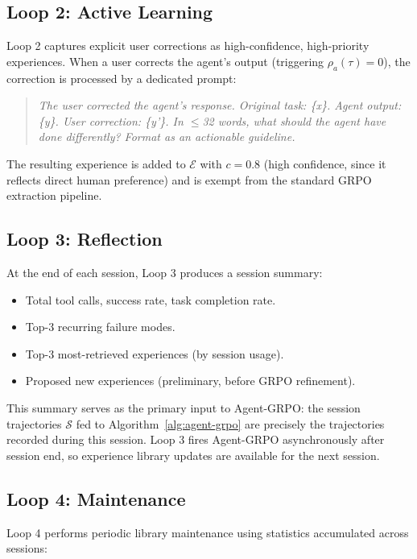 \subsection{Loop 2: Active Learning}

Loop 2 captures explicit user corrections as high-confidence, high-priority
experiences. When a user corrects the agent's output (triggering
$\rho_a(\tau) = 0$), the correction is processed by a dedicated prompt:

\begin{quote}
\textit{The user corrected the agent's response. Original task: \{x\}. Agent
output: \{y\}. User correction: \{y'\}. In $\leq$32 words, what should the
agent have done differently? Format as an actionable guideline.}
\end{quote}

The resulting experience is added to $\mathcal{E}$ with $c = 0.8$ (high
confidence, since it reflects direct human preference) and is exempt from the
standard GRPO extraction pipeline.

\subsection{Loop 3: Reflection}

At the end of each session, Loop 3 produces a session summary:
\begin{itemize}[leftmargin=1.5em]
    \item Total tool calls, success rate, task completion rate.
    \item Top-3 recurring failure modes.
    \item Top-3 most-retrieved experiences (by session usage).
    \item Proposed new experiences (preliminary, before GRPO refinement).
\end{itemize}

This summary serves as the primary input to Agent-GRPO: the session
trajectories $\mathcal{S}$ fed to Algorithm~\ref{alg:agent-grpo} are
precisely the trajectories recorded during this session. Loop 3 fires
Agent-GRPO asynchronously after session end, so experience library updates
are available for the next session.

\subsection{Loop 4: Maintenance}

Loop 4 performs periodic library maintenance using statistics accumulated
across sessions:

